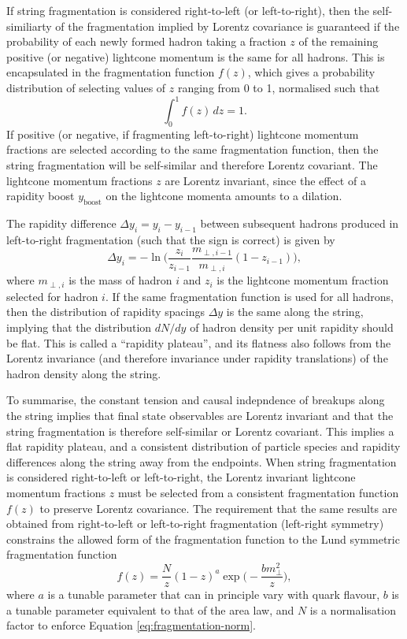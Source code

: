 \documentclass[12pt,a4paper]{report}
\begin{document}
If string fragmentation is considered right-to-left (or left-to-right), then the self-similiarty of the fragmentation implied by Lorentz covariance is guaranteed if the probability of each newly formed hadron taking a fraction $z$ of the remaining positive (or negative) lightcone momentum is the same for all hadrons. This is encapsulated in the fragmentation function $f(z)$, which gives a probability distribution of selecting values of $z$ ranging from 0 to 1, normalised such that
\begin{equation}\label{eq:fragmentation-norm}
  \int_0^1 f(z) \, dz = 1.
\end{equation}
If positive (or negative, if fragmenting left-to-right) lightcone momentum fractions are selected according to the same fragmentation function, then the string fragmentation will be self-similar and therefore Lorentz covariant. The lightcone momentum fractions $z$ are Lorentz invariant, since the effect of a rapidity boost $y_\text{boost}$ on the lightcone momenta amounts to a dilation.

The rapidity difference $\Delta y_i = y_i - y_{i - 1}$ between subsequent hadrons produced in left-to-right fragmentation (such that the sign is correct) is given by
\begin{equation}
  \Delta y_i = -\ln \Bigr( \frac{z_i}{z_{i-1}} \frac{m_{\perp,i-1}}{m_{\perp,i}} (1 - z_{i-1})  \Bigr),
\end{equation}
where $m_{\perp,i}$ is the mass of hadron $i$ and $z_i$ is the lightcone momentum fraction selected for hadron $i$. If the same fragmentation function is used for all hadrons, then the distribution of rapidity spacings $\Delta y$ is the same along the string, implying that the distribution $dN/dy$ of hadron density per unit rapidity should be flat. This is called a ``rapidity plateau'', and its flatness also follows from the Lorentz invariance (and therefore invariance under rapidity translations) of the hadron density along the string.

To summarise, the constant tension and causal indepndence of breakups along the string implies that final state observables are Lorentz invariant and that the string fragmentation is therefore self-similar or Lorentz covariant. This implies a flat rapidity plateau, and a consistent distribution of particle species and rapidity differences along the string away from the endpoints. When string fragmentation is considered right-to-left or left-to-right, the Lorentz invariant lightcone momentum fractions $z$ must be selected from a consistent fragmentation function $f(z)$ to preserve Lorentz covariance. The requirement that the same results are obtained from right-to-left or left-to-right fragmentation (left-right symmetry) constrains the allowed form of the fragmentation function to the Lund symmetric fragmentation function
\begin{equation}\label{eq:lund-fragmentation-function}
  f(z) = \frac{N}{z} (1-z)^a \exp\Bigr( -\frac{b m_\perp^2}{z}\Bigr),
\end{equation}
where $a$ is a tunable parameter that can in principle vary with quark flavour, $b$ is a tunable parameter equivalent to that of the area law, and $N$ is a normalisation factor to enforce Equation \eqref{eq:fragmentation-norm}.
\end{document}
